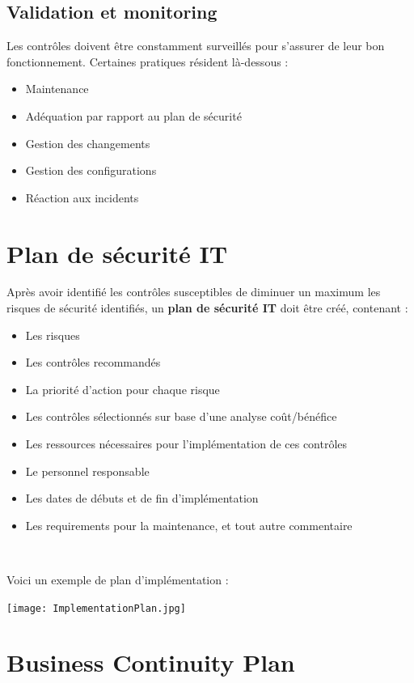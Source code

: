 \documentclass{report}
\begin{document}
\subsection{Validation et monitoring}

Les contrôles doivent être constamment surveillés pour s'assurer de leur bon fonctionnement. Certaines pratiques résident là-dessous :
\begin{itemize}
    \item Maintenance
    \item Adéquation par rapport au plan de sécurité
    \item Gestion des changements
    \item Gestion des configurations
    \item Réaction aux incidents
\end{itemize}

\section{Plan de sécurité IT}

Après avoir identifié les contrôles susceptibles de diminuer un maximum les risques de sécurité identifiés, un \textbf{plan de sécurité IT} doit être créé, contenant :
\begin{itemize}
    \item Les risques
    \item Les contrôles recommandés
    \item La priorité d'action pour chaque risque
    \item Les contrôles sélectionnés sur base d'une analyse coût/bénéfice
    \item Les ressources nécessaires pour l'implémentation de ces contrôles
    \item Le personnel responsable
    \item Les dates de débuts et de fin d'implémentation
    \item Les requirements pour la maintenance, et tout autre commentaire
\end{itemize}~

Voici un exemple de plan d'implémentation :

\texttt{[image: ImplementationPlan.jpg]}

\section{Business Continuity Plan}
\end{document}
